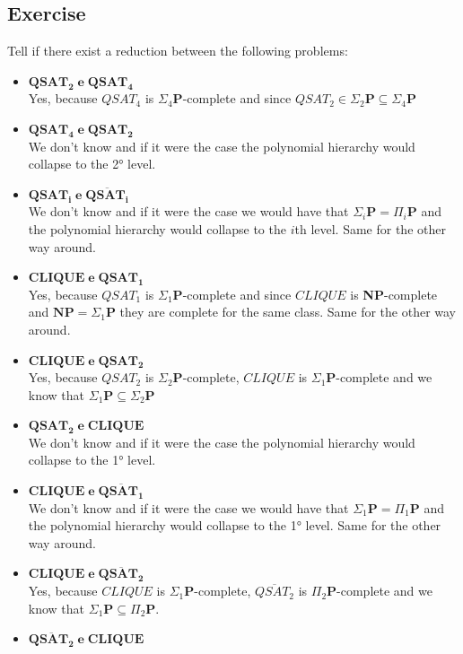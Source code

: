 \subsection{Exercise}
Tell if there exist a reduction between the following problems:
\begin{itemize}
    \item $\mathbf{QSAT_2 \; e \; QSAT_4}$\\
    Yes, because $QSAT_4$ is $\Sigma_4\mathbf{P}$-complete and since $QSAT_2\in\Sigma_2\mathbf{P}\subseteq\Sigma_4\mathbf{P}$
    \item $\mathbf{QSAT_4 \; e \; QSAT_2}$\\
    We don't know and if it were the case the polynomial hierarchy would collapse to the 2° level.
    \item $\mathbf{QSAT_i \; e \; \overline{QSAT_i}}$\\
    We don't know and if it were the case we would have that $\Sigma_i\mathbf{P}=\Pi_i\mathbf{P}$ and the polynomial hierarchy would collapse to the $i$th level.
    Same for the other way around.
    \item $\mathbf{CLIQUE \; e \; QSAT_1}$\\
    Yes, because $QSAT_1$ is $\Sigma_1\mathbf{P}$-complete and since $CLIQUE$ is \textbf{NP}-complete and $\textbf{NP}=\Sigma_1\mathbf{P}$ they are complete for the same class. Same for the other way around.
    \item $\mathbf{CLIQUE \; e \; QSAT_2}$\\
    Yes, because $QSAT_2$ is $\Sigma_2\mathbf{P}$-complete, $CLIQUE$ is $\Sigma_1\mathbf{P}$-complete and we know that $\Sigma_1\mathbf{P}\subseteq\Sigma_2\mathbf{P}$ 
    \item $\mathbf{QSAT_2 \; e \; CLIQUE}$\\
    We don't know and if it were the case the polynomial hierarchy would collapse to the 1° level.
    \item $\mathbf{CLIQUE \; e \; \overline{QSAT_1}}$\\
    We don't know and if it were the case we would have that $\Sigma_1\mathbf{P}=\Pi_1\mathbf{P}$ and the polynomial hierarchy would collapse to the 1° level. Same for the other way around.
    \item $\mathbf{CLIQUE \; e \; \overline{QSAT_2}}$\\
    Yes, because $CLIQUE$ is $\Sigma_1\mathbf{P}$-complete, $\overline{QSAT_2}$ is $\Pi_2\mathbf{P}$-complete and we know that $\Sigma_1\mathbf{P}\subseteq\Pi_2\mathbf{P}$.
    \item $\mathbf{ \overline{QSAT_2}\; e \;CLIQUE }$\\

\end{itemize}
